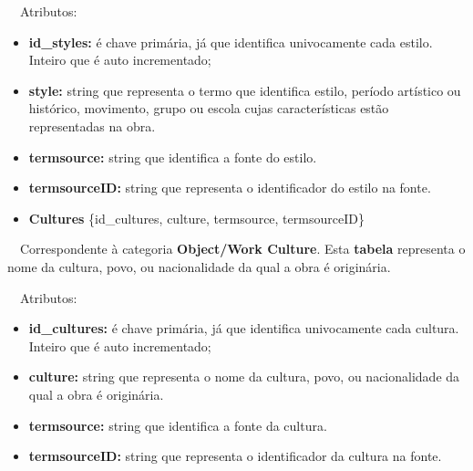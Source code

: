 \documentclass[letterpaper]{article}
\newcommand\textstyleStrongEmphasis[1]{\textbf{#1}}
\newcommand\liststyleLi{%
\renewcommand\labelitemi{{\textbullet}}
\renewcommand\labelitemii{[27A2?]}
\renewcommand\labelitemiii{{\textbullet}}
\renewcommand\labelitemiv{{\textbullet}}
}
\newcommand\liststyleLxiv{%
\renewcommand\labelitemi{[27A2?]}
\renewcommand\labelitemii{[27A2?]}
\renewcommand\labelitemiii{[27A2?]}
\renewcommand\labelitemiv{[27A2?]}
}
\begin{document}
\bigskip

{
\ \ Atributos:}

\liststyleLxiv
\begin{itemize}
\item {
\textbf{id\_styles: }\'e chave prim\'aria, j\'a que identifica
univocamente cada estilo. Inteiro que \'e auto incrementado;}
\item {
\textbf{style: }string que representa o termo que identifica estilo,
per\'iodo art\'istico ou hist\'orico, movimento, grupo ou escola cujas
caracter\'isticas est\~ao representadas na obra.}
\item {
\textbf{termsource: }string que identifica a fonte do estilo.}
\item {
\textbf{termsourceID:} string que representa o identificador do estilo
na fonte.}
\end{itemize}

\bigskip

\liststyleLi
\begin{itemize}
\item {
\textbf{Cultures }\{id\_cultures, culture, termsource, termsourceID\}}
\end{itemize}
{
\foreignlanguage{english}{\ \ Correspondente \`a categoria
}\textstyleStrongEmphasis{\foreignlanguage{english}{Object/Work
Culture}}\foreignlanguage{english}{. Esta
}\textstyleStrongEmphasis{\foreignlanguage{english}{\textmd{tabela}}}\foreignlanguage{english}{
representa o nome da cultura, povo, ou nacionalidade da qual a obra \'e
origin\'aria.}}


\bigskip

{
\ \ Atributos:}

\liststyleLxiv
\begin{itemize}
\item {
\textbf{id\_cultures: }\'e chave prim\'aria, j\'a que identifica
univocamente cada cultura. Inteiro que \'e auto incrementado;}
\item {
\textbf{culture: }string que representa o nome da cultura, povo, ou
nacionalidade da qual a obra \'e origin\'aria.}
\item {
\textbf{termsource: }string que identifica a fonte da cultura.}
\item {
\textbf{termsourceID:} string que representa o identificador da cultura
na fonte.}
\end{itemize}
\end{document}
